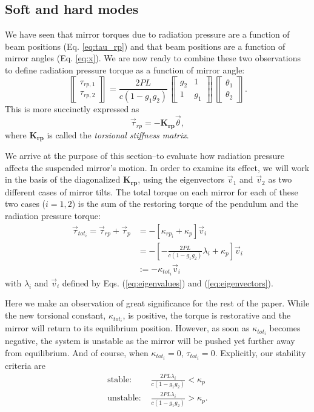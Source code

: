 \subsection{Soft and hard modes}
We have seen that mirror torques due to radiation pressure are a
function of beam positions (Eq. \ref{eq:tau_rp}) and that beam
positions are a function of mirror angles (Eq. \ref{eq:x}). We are now
ready to combine these two observations to define radiation pressure
torque as a function of mirror angle:
\begin{equation}
\left\llbracket \begin{array}{c}
\tau_{rp,1}\\
\tau_{rp,2} \end{array} \right\rrbracket = \frac{2 P L}{c (1-g_1 g_2)}
\left\llbracket \begin{array}{cc}
g_2 & 1\\
1 & g_1\end{array} \right\rrbracket
\left\llbracket \begin{array}{c}
\theta_1\\
\theta_2 \end{array} \right\rrbracket.
\end{equation}
This is more succinctly expressed as
\begin{equation}
\vec{\tau}_{rp} = -\mathbf{K_{rp}} \vec{\theta},
\end{equation}
where $\mathbf{K_{rp}}$ is called the \emph{torsional stiffness matrix}. 

We arrive at the purpose of this section--to evaluate how radiation
pressure affects the suspended mirror's motion. In order to examine
its effect, we will work in the basis of the diagonalized
$\mathbf{K_{rp}}$, using the eigenvectors $\vec{v}_1$ and $\vec{v}_2$
as two different cases of mirror tilts. The total torque on each
mirror for each of these two cases ($i=1,2$) is the sum of the
restoring torque of the pendulum and the radiation pressure torque:
\begin{align}
\vec{\tau}_{tot_i} = \vec{\tau}_{rp} + \vec{\tau}_{p} &= -[\kappa_{rp_i} + \kappa_p] \vec{v}_i \\
&= -\left[- \frac{2 P L}{c (1-g_1 g_2)} \lambda_i + \kappa_{p}\right] \vec{v}_i \\
&:= -\kappa_{tot_i} \vec{v}_i
\label{eq:torque_tot}
\end{align}
with $\lambda_i$ and $\vec{v}_i$ defined by Eqs. (\ref{eq:eigenvalues}) and (\ref{eq:eigenvectors}).


Here we make an observation of great significance for the rest of the
paper. While the new torsional constant, $\kappa_{tot_i}$, is
positive, the torque is restorative and the mirror will 
return to its equilibrium position. However, as soon as $\kappa_{tot_i}$
becomes negative, the system is unstable as the mirror will be pushed
yet further away from equilibrium. And of course, when $\kappa_{tot_i}=0$,
$\tau_{tot_i}=0$. Explicitly, our stability criteria are 
\begin{align}
\mbox{stable: } &\frac{2 P L \lambda_i}{c (1-g_1 g_2)} < \kappa_p \\
\mbox{unstable: } &\frac{2 P L \lambda_i}{c (1-g_1 g_2)} > \kappa_p.
\label{eq:stability}
\end{align}

